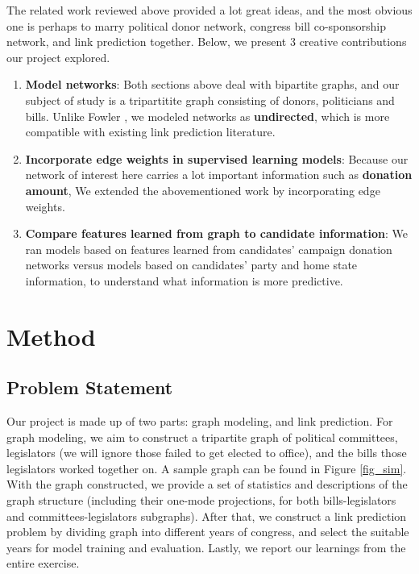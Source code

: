 \documentclass[12pt,twocolumn]{article}
\begin{document}
The related work reviewed above provided a lot great ideas, and the most obvious one is perhaps to marry political donor network, congress bill co-sponsorship network, and link prediction together. Below, we present 3 creative contributions our project explored. 
\begin{enumerate}
\item \textbf{Model networks}: Both sections above deal with bipartite graphs, and our subject of study is a tripartitite graph consisting of donors, politicians and bills. Unlike Fowler \cite{fowler2006connecting}, we modeled networks as \textbf{undirected}, which is more compatible with existing link prediction literature. 
\item \textbf{Incorporate edge weights in supervised learning models}: Because our network of interest here carries a lot important information such as \textbf{donation amount}, We extended the abovementioned work by incorporating edge weights.  
\item \textbf{Compare features learned from graph to candidate information}: We ran models based on features learned from candidates' campaign donation networks versus models based on candidates' party and home state information, to understand what information is more predictive.
\end{enumerate}

\section{Method}
\subsection{Problem Statement}
Our project is made up of two parts: graph modeling, and link prediction. For graph modeling, we aim to construct a tripartite graph of political committees, legislators (we will ignore those failed to get elected to office), and the bills those legislators worked together on. A sample graph can be found in Figure \ref{fig_sim}. With the graph constructed, we provide a set of statistics and descriptions of the graph structure (including their one-mode projections, for both bills-legislators and committees-legislators subgraphs). After that, we construct a link prediction problem by dividing graph into different years of congress, and select the suitable years for model training and evaluation. Lastly, we report our learnings from the entire exercise. 
\end{document}
